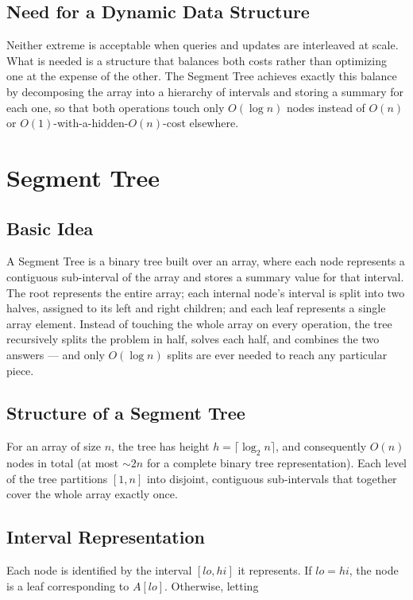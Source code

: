 \documentclass[11pt]{scrartcl}
\begin{document}
\subsection{Need for a Dynamic Data Structure}
Neither extreme is acceptable when queries and updates are interleaved at scale. What is needed is a structure that balances both costs rather than optimizing one at the expense of the other. The Segment Tree achieves exactly this balance by decomposing the array into a hierarchy of intervals and storing a summary for each one, so that both operations touch only $O(\log n)$ nodes instead of $O(n)$ or $O(1)$-with-a-hidden-$O(n)$-cost elsewhere.

\section{Segment Tree}

\subsection{Basic Idea}
A Segment Tree is a binary tree built over an array, where each node represents a contiguous sub-interval of the array and stores a summary value for that interval. The root represents the entire array; each internal node's interval is split into two halves, assigned to its left and right children; and each leaf represents a single array element. Instead of touching the whole array on every operation, the tree recursively splits the problem in half, solves each half, and combines the two answers --- and only $O(\log n)$ splits are ever needed to reach any particular piece.

\subsection{Structure of a Segment Tree}
For an array of size $n$, the tree has height $h = \lceil \log_2 n \rceil$, and consequently $O(n)$ nodes in total (at most $\sim\!2n$ for a complete binary tree representation). Each level of the tree partitions $[1,n]$ into disjoint, contiguous sub-intervals that together cover the whole array exactly once.

\subsection{Interval Representation}
Each node is identified by the interval $[lo, hi]$ it represents. If $lo = hi$, the node is a leaf corresponding to $A[lo]$. Otherwise, letting
\end{document}
